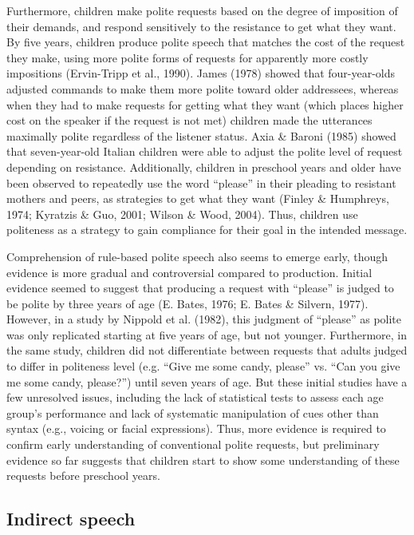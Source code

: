 \documentclass[oneside]{report}
\begin{document}
Furthermore, children make polite requests based on the degree of
imposition of their demands, and respond sensitively to the resistance
to get what they want. By five years, children produce polite speech
that matches the cost of the request they make, using more polite forms
of requests for apparently more costly impositions (Ervin-Tripp et al.,
1990). James (1978) showed that four-year-olds adjusted commands to make
them more polite toward older addressees, whereas when they had to make
requests for getting what they want (which places higher cost on the
speaker if the request is not met) children made the utterances
maximally polite regardless of the listener status. Axia \& Baroni
(1985) showed that seven-year-old Italian children were able to adjust
the polite level of request depending on resistance. Additionally,
children in preschool years and older have been observed to repeatedly
use the word ``please'' in their pleading to resistant mothers and
peers, as strategies to get what they want (Finley \& Humphreys, 1974;
Kyratzis \& Guo, 2001; Wilson \& Wood, 2004). Thus, children use
politeness as a strategy to gain compliance for their goal in the
intended message.

Comprehension of rule-based polite speech also seems to emerge early,
though evidence is more gradual and controversial compared to
production. Initial evidence seemed to suggest that producing a request
with ``please'' is judged to be polite by three years of age (E. Bates,
1976; E. Bates \& Silvern, 1977). However, in a study by Nippold et al.
(1982), this judgment of ``please'' as polite was only replicated
starting at five years of age, but not younger. Furthermore, in the same
study, children did not differentiate between requests that adults
judged to differ in politeness level (e.g. ``Give me some candy,
please'' vs. ``Can you give me some candy, please?'') until seven years
of age. But these initial studies have a few unresolved issues,
including the lack of statistical tests to assess each age group's
performance and lack of systematic manipulation of cues other than
syntax (e.g., voicing or facial expressions). Thus, more evidence is
required to confirm early understanding of conventional polite requests,
but preliminary evidence so far suggests that children start to show
some understanding of these requests before preschool years.

\subsection{Indirect speech}\label{indirect-speech}
\end{document}
